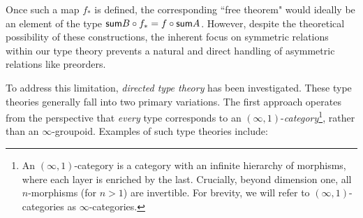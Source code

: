 \documentclass[main.tex]{subfiles}
\begin{document}
Once such a map $f_*$ is defined, the corresponding ``free theorem" would ideally be an element of the type $\mathsf{sum}{B} \circ f_* = f \circ \mathsf{sum}{A}$. However, despite the theoretical possibility of these constructions, the inherent focus on symmetric relations within our type theory prevents a natural and direct handling of asymmetric relations like preorders.

To address this limitation, \textit{directed type theory} has been investigated. These type theories generally fall into two primary variations. The first approach operates from the perspective that \textit{every} type corresponds to an $(\infty,1)$-\textit{category}\footnote{An $(\infty,1)$-category is a category with an infinite hierarchy of morphisms, where each layer is enriched by the last. Crucially, beyond dimension one, all $n$-morphisms (for $n > 1$) are invertible. For brevity, we will refer to $(\infty,1)$-categories as $\infty$-categories.}, rather than an $\infty$-groupoid. Examples of such type theories include:
\end{document}
